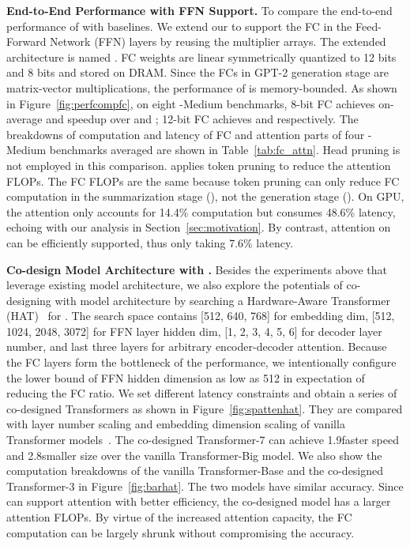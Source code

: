 


\textbf{End-to-End Performance with FFN Support.} To compare the end-to-end performance of \name with baselines. We extend our {\spattenfull} to support the FC in the  Feed-Forward Network (FFN) layers by reusing the multiplier arrays. The extended architecture is named {\spattenfc}.
FC weights are linear symmetrically quantized to 12 bits and 8 bits and stored on DRAM. Since the FCs in GPT-2 generation stage are matrix-vector multiplications, the performance of {\spattenfc} is memory-bounded. As shown in Figure~\ref{fig:perfcompfc}, on eight \gpttwo-Medium benchmarks, 8-bit FC \spattenfc\xspace achieves on-average \perffcovertitanxpteight\x and \perffcoverxeoneight\x speedup over \titanxp\xspace and \xeon; 12-bit FC \spattenfc\xspace achieves \perffcovertitanxptwelve\x and \perffcoverxeontwelve\x respectively. The breakdowns of computation and latency of FC and attention parts of four \gpttwo-Medium benchmarks averaged are shown in Table~\ref{tab:fc_attn}. Head pruning is not employed in this comparison. \spattenfc\xspace applies token pruning to reduce the attention FLOPs. The FC FLOPs are the same because token pruning can only reduce FC computation in the summarization stage (\bert), not the generation stage (\gpttwo). On GPU, the attention only accounts for 14.4\% computation but consumes 48.6\% latency, echoing with our analysis in Section~\ref{sec:motivation}. By contrast, attention on \spattenfc\xspace can be efficiently supported, thus only taking 7.6\% latency.

\textbf{Co-design Model Architecture with \name.} Besides the experiments above that leverage existing model architecture, we also explore the potentials of co-designing \name with model architecture by searching a 
Hardware-Aware Transformer (HAT)~\cite{hanruiwang2020hat} for \spattenfc. The search space contains [512, 640, 768] for embedding dim, [512, 1024, 2048, 3072] for FFN layer hidden dim, [1, 2, 3, 4, 5, 6] for decoder layer number, and last three layers for arbitrary encoder-decoder attention. Because the FC layers form the bottleneck of the \spattenfull\xspace performance, we intentionally configure the lower bound of FFN hidden dimension as low as 512 in expectation of reducing the FC ratio. We set different latency constraints and obtain a series of co-designed Transformers as shown in Figure~\ref{fig:spattenhat}. They are compared with layer number scaling and embedding dimension scaling of vanilla Transformer models~\cite{46201}. The co-designed Transformer-7 can achieve 1.9\x faster speed and 2.8\x smaller size over the vanilla Transformer-Big model. We also show the computation breakdowns of the vanilla Transformer-Base and the co-designed Transformer-3 in Figure~\ref{fig:barhat}. The two models have similar accuracy. Since \spattenfc\xspace can support attention with better efficiency, the co-designed model has a larger attention FLOPs. By virtue of the increased attention capacity, the FC computation can be largely shrunk without compromising the accuracy.



